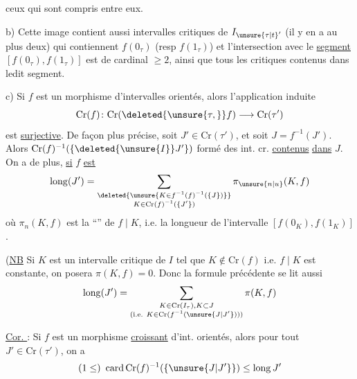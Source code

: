 ceux qui sont compris entre eux.

b) Cette image contient  aussi
 intervalles critiques de $I_{\unsure{\tau|t}'}$ (il y en a au plus
deux) qui contiennent  $f(0_\tau)$ (resp $f(1_\tau)$) et 
l'intersection avec le \uline{segment} $[f(0_\tau),f(1_\tau)]$
est de cardinal $\geq2$, ainsi que tous les
 critiques contenus dans ledit segment.

c) Si $f$ est un morphisme  d'intervalles orientés, alors l'application induite
\[
\mathrm{Cr}(f)\colon\mathrm{Cr}(\deleted{\unsure{\tau,}}f)\longrightarrow\mathrm{Cr}(\tau')
\]
est   \uline{surjective}.  De façon
plus  précise, soit $J'\in\mathrm{Cr}(\tau')$, et soit
$J=f^{-1}(J')$. Alors $\mathrm{Cr}(f)^{-1}(\{\deleted{\unsure{I}}J'\})$  formé des
int. cr.  \uline{contenus} \uline{dans} $J$. 
On a de plus, \uline{si} $f$ \uline{est }
\[
\operatorname{long}(J')=
\sum_{\substack{\deleted{\unsure{K\in f^{-1}(f)^{-1}(\{J\})}}\\
 K\in\mathrm{Cr}(f)^{-1}(\{J'\})}}\pi_{\unsure{n|u}}(K,f)
\]
où $\pi_n(K,f)$ est la ``''  de $f\mid K$,  i.e.
la longueur de l'intervalle $[f(0_K),f(1_K)]$.

(\uline{NB} Si $K$ est un intervalle critique de $I$ tel que
$K\notin\mathrm{Cr}(f)$ i.e. $f\mid K$ est constante, on posera
$\pi(K,f)=0$. Donc la formule précédente se lit aussi
\[
\operatorname{long}(J')=\sum_{\substack{K\in\mathrm{Cr}(I_\tau),K\subset J\\
(\text{i.e. }K\in\mathrm{Cr}(f^{-1}(\unsure{J|J'})))}}\pi(K,f)
\]

\uline{Cor. } : Si $f$ est un morphisme \uline{croissant} d'int.
orientés, alors pour tout $J'\in\mathrm{Cr}(\tau')$,  on a
\[
(1\leq)\ \operatorname{card}\mathrm{Cr}(f)^{-1}(\{\unsure{J|J'}\})\leq\operatorname{long}J'
\]
